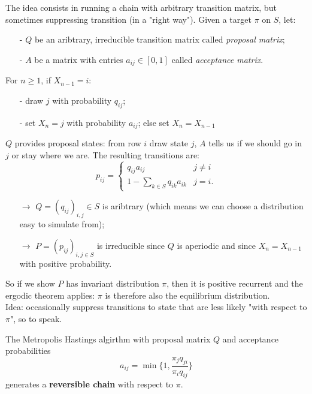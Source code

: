 \documentclass{article}
\begin{document}
The idea consists in running a chain with arbitrary transition matrix, but sometimes suppressing transition (in a "right way"). Given a target $\pi$ on $S$, let:
\begin{itemize}
    \item [-]$Q$ be an aribtrary, irreducible transition matrix called \textit{proposal matrix};
    \item [-]$A$ be a matrix with entries $a_{ij}\in[0,1]$ called \textit{acceptance matrix}.
\end{itemize}
\begin{algorithm}
    For $n\geqslant 1$, if $X_{n-1}=i$:
    \begin{itemize}
        \item [-] draw $j$ with probability $q_{ij}$;
        \item [-] set $X_n=j$ with probability $a_{ij}$; else set $X_n=X_{n-1}$
    \end{itemize}
\end{algorithm}
$Q$ provides proposal states: from row $i$ draw state $j$, $A$ tells us if we should go in $j$ or stay where we are. The resulting transitions are:
\[
p_{ij}=\begin{cases}
    q_{ij}a_{ij} &j\neq i\\
    1-\sum_{k\in S}  q_{ik}a_{ik} &j=i.
\end{cases}
\]
\begin{itemize}
    \item[$\rightarrow$]$Q=(q_{ij})_{i,j}\in S$ is aribtrary (which means we can choose a distribution easy to simulate from);
    \item[$\rightarrow$]$P=(p_{ij})_{i,j\in S}$ is irreducible since $Q$ is aperiodic and since $X_n=X_{n-1}$ with positive probability.
\end{itemize}
So if we show $P$ has invariant distribution $\pi$, then it is positive recurrent and the ergodic theorem applies: $\pi$ is therefore also the equilibrium distribution. \\
Idea: occasionally suppress transitions to state that are less likely "with respect to $\pi$", so to speak.
\begin{proposition}
    The Metropolis Hastings algirthm with proposal matrix $Q$ and acceptance probabilities
        \[
        a_{ij}=\min\bigg\{1,\frac{\pi_jq_{ji}}{\pi_iq_{ij}}\bigg\}
        \]
        generates a \textbf{reversible chain} with respect to $\pi$.
\end{proposition}
\end{document}
